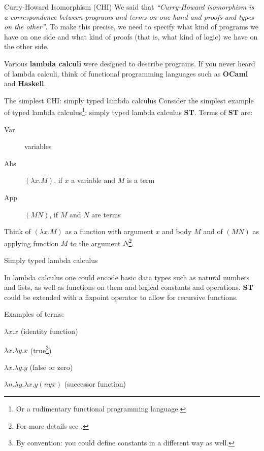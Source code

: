 \documentclass[10pt]{beamer}
\begin{document}
   \begin{frame}{Curry-Howard Isomorphism (CHI)}
     We said that {\it ``Curry-Howard isomorphism is a correspondence between programs and terms on one hand and proofs and types on the other''}. To make this precise, we need to specify what kind of programs we have on one side and what kind of proofs (that is, what kind of logic) we have on the other side.

     Various {\bf lambda calculi} were designed to describe programs.%
     If you never heard of lambda calculi, think of functional programming languages such as {\bf OCaml} and {\bf Haskell}.
     
\end{frame}
\begin{frame}{The simplest CHI: simply typed lambda calculus}
    Consider the simplest example of typed lambda calculus\footnote{Or a rudimentary functional programming language.}: simply typed lambda calculus {\bf ST}. Terms of {\bf ST} are:
     \begin{description}
     \item[Var] variables
     \item[Abs] $(\lambda x.M)$, if $x$ a variable and $M$ is a term 
     \item[App] $(M N)$, if $M$ and $N$ are terms
     \end{description}
     Think of $(\lambda x.M)$ as a function with argument $x$ and body $M$ and of $(M N)$ as applying function $M$ to the argument $N$\footnote{For more details see \cite{Sørensen98lectureson}.}. %

\end{frame}
\begin{frame}{Simply typed lambda calculus}
       
     In lambda calculus one could encode basic data types such as natural numbers and lists, as well as functions on them and logical constants and operations. {\bf ST} could be extended with a fixpoint operator to allow for recursive functions.

     Examples of terms:

     $\lambda x.x$ (identity function)
     
     $\lambda x.\lambda y. x$ (true\footnote{By convention: you could define constants in a different way as well.})

     $\lambda x.\lambda y. y$ (false or zero)

     $\lambda n. \lambda y. \lambda x. y (n y x)$ (successor function)
\end{frame}
\end{document}
